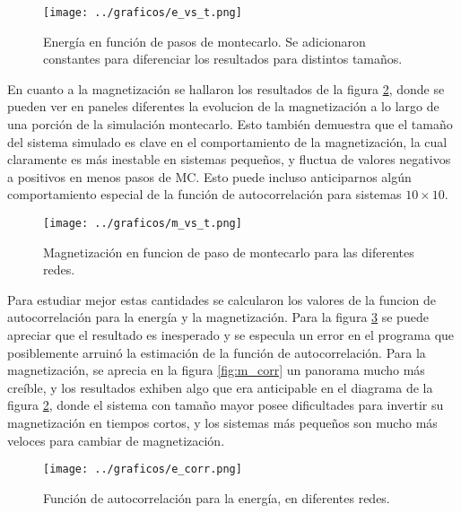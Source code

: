 \documentclass[a4paper,10pt]{paper}
\begin{document}
\begin{figure}[!h]
 \centering
 \texttt{[image: ../graficos/e\_vs\_t.png]}
 \caption{Energ\'ia en funci\'on de pasos de montecarlo. Se adicionaron constantes para diferenciar los resultados para distintos tama\~nos.}
 \label{fig:eja_e_vs_t}
\end{figure}

En cuanto a la magnetizaci\'on se hallaron los resultados de la figura \ref{fig:eja_m_vs_t}, donde se pueden ver en paneles diferentes
la evolucion de la magnetizaci\'on a lo largo de una porci\'on de la simulaci\'on montecarlo. Esto tambi\'en demuestra que el tama\~no del
sistema simulado es clave en el comportamiento de la magnetizaci\'on, la cual claramente es m\'as inestable en sistemas peque\~nos, y fluctua
de valores negativos a positivos en menos pasos de MC. Esto puede incluso anticiparnos alg\'un comportamiento especial de la funci\'on de 
autocorrelaci\'on para sistemas $10\times10$.

\begin{figure}[!h]
 \centering
 \texttt{[image: ../graficos/m\_vs\_t.png]}
 \caption{Magnetizaci\'on en funcion de paso de montecarlo para las diferentes redes.}
 \label{fig:eja_m_vs_t}
\end{figure}

Para estudiar mejor estas cantidades se calcularon los valores de la funcion de autocorrelaci\'on para la energ\'ia y la 
magnetizaci\'on.
Para la figura \ref{fig:e_corr} se puede apreciar que el resultado es inesperado y se especula un error en el programa que posiblemente
arruin\'o la estimaci\'on de la funci\'on de autocorrelaci\'on.
Para la magnetizaci\'on, se aprecia en la figura \ref{fig:m_corr} un panorama mucho m\'as cre\'ible, y los resultados exhiben algo que era 
anticipable en el diagrama de la figura \ref{fig:eja_m_vs_t}, donde el sistema con tama\~no mayor posee dificultades para invertir su magnetizaci\'on en
tiempos cortos, y los sistemas m\'as peque\~nos son mucho m\'as veloces para cambiar de magnetizaci\'on.

\begin{figure}[!h]
 \centering
 \texttt{[image: ../graficos/e\_corr.png]}
 \caption{Funci\'on de autocorrelaci\'on para la energ\'ia, en diferentes redes.}
 \label{fig:e_corr}
\end{figure}
\end{document}

